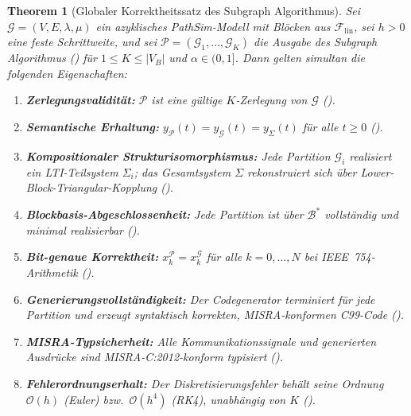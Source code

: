 ﻿\documentclass[12pt,a4paper]{article}
\newtheorem{theorem}{Theorem}[section]
\theoremstyle{definition}
\begin{document}
\begin{theorem}[Globaler Korrektheitssatz des Subgraph Algorithmus]
\label{thm:subgraph-global}
Sei $\mathcal{G} = (V, E, \lambda, \mu)$ ein azyklisches PathSim-Modell
mit Blöcken aus $\mathcal{F}_{\mathrm{lin}}$, sei $h > 0$ eine feste
Schrittweite, und sei
$\mathcal{P} = (\mathcal{G}_1, \ldots, \mathcal{G}_K)$
die Ausgabe des Subgraph Algorithmus () für
$1 \leq K \leq |V_B|$ und $\alpha \in (0,1]$.
Dann gelten simultan die folgenden Eigenschaften:

\begin{enumerate}[label=\textbf{(P\arabic*)}]
  \item \textbf{Zerlegungsvalidität:} $\mathcal{P}$ ist eine gültige
        $K$-Zerlegung von $\mathcal{G}$ ().

  \item \textbf{Semantische Erhaltung:}
        $y_{\mathcal{P}}(t) = y_{\mathcal{G}}(t) = y_{\Sigma}(t)$
        für alle $t \geq 0$
        ().

  \item \textbf{Kompositionaler Strukturisomorphismus:}
        Jede Partition $\mathcal{G}_i$ realisiert ein LTI-Teilsystem
        $\Sigma_i$; das Gesamtsystem $\Sigma$ rekonstruiert sich über
        Lower-Block-Triangular-Kopplung ().

  \item \textbf{Blockbasis-Abgeschlossenheit:}
        Jede Partition ist über $\mathcal{B}^*$ vollständig und minimal
        realisierbar ().

  \item \textbf{Bit-genaue Korrektheit:}
        $x_k^{\mathcal{P}} = x_k^{\mathcal{G}}$ für alle $k = 0, \ldots, N$
        bei IEEE~754-Arithmetik ().

  \item \textbf{Generierungsvollständigkeit:}
        Der Codegenerator terminiert für jede Partition und erzeugt
        syntaktisch korrekten, MISRA-konformen C99-Code
        ().

  \item \textbf{MISRA-Typsicherheit:}
        Alle Kommunikationssignale und generierten Ausdrücke sind
        MISRA-C:2012-konform typisiert
        ().

  \item \textbf{Fehlerordnungserhalt:}
        Der Diskretisierungsfehler behält seine Ordnung
        $\mathcal{O}(h)$ (Euler) bzw.\ $\mathcal{O}(h^4)$ (RK4),
        unabhängig von $K$
        ().


\end{enumerate}
\end{theorem}
\end{document}
